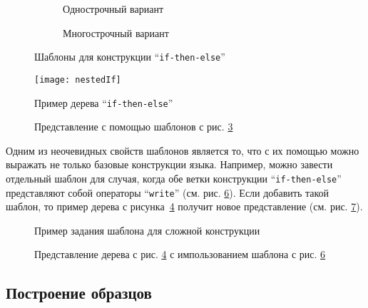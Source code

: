 \begin{figure}[h!]
	\begin{subfigure}[h]{0.45\textwidth}
		
		\caption{Однострочный вариант}
		\label{fig:flatGoodIfTmplt}
	\end{subfigure}
	
	\begin{subfigure}[h]{0.45\textwidth}
		
		\caption{Многострочный вариант}
		\label{fig:multBadIfTmplt}
	\end{subfigure}
	\caption{Шаблоны для конструкции “\lstinline{if-then-else}”}
	\label{fig:ifTmplt}
\end{figure}

\begin{figure}[h!]
	\centering
	\texttt{[image: nestedIf]}
	\caption{Пример дерева “\lstinline{if-then-else}”}
	\label{fig:nestedIf}
\end{figure}

\begin{figure}[h!]
	\centering
	
	\caption{Представление с помощью шаблонов с рис. \ref{fig:ifTmplt}}
	\label{fig:nestedIfCode}
\end{figure}

Одним из неочевидных свойств шаблонов является то, что с их помощью можно выражать не только базовые конструкции языка.
Например, можно завести отдельный шаблон для случая, когда обе ветки конструкции “\lstinline{if-then-else}” представляют собой операторы “\lstinline{write}” (см. рис. \ref{fig:writeNestedInIf}). Если добавить такой шаблон, то пример дерева с рисунка~\ref{fig:nestedIf} получит новое представление (см. рис. \ref{fig:nestedIfNew}).

\begin{figure}[h!]
	
	\caption{Пример задания шаблона для сложной конструкции}
	\label{fig:writeNestedInIf}
\end{figure}

\begin{figure}[h!]
	
	\caption{Представление дерева с рис. \ref{fig:nestedIf} с импользованием шаблона с рис. \ref{fig:writeNestedInIf}}
	\label{fig:nestedIfNew}
\end{figure}

\subsection{Построение образцов}

